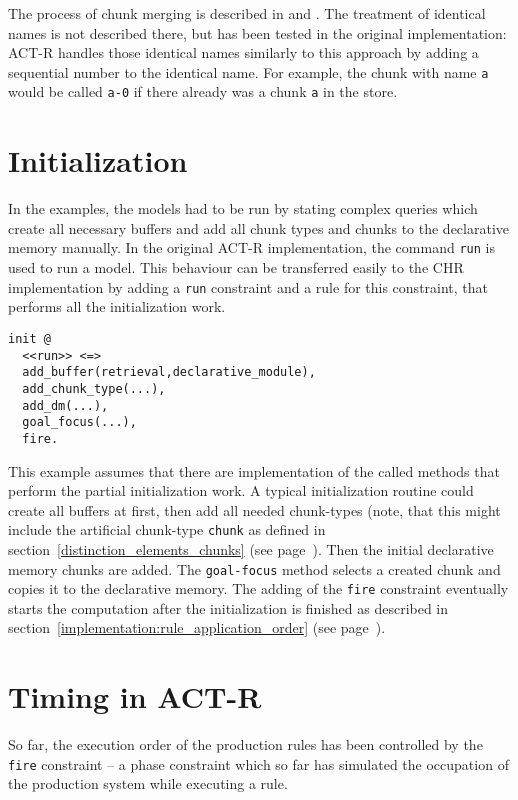The process of chunk merging is described in \cite[217, 71]{actr_reference} and \cite[3]{actr_tutorial}. The treatment of identical names is not described there, but has been tested in the original implementation: ACT-R handles those identical names similarly to this approach by adding a sequential number to the identical name. For example, the chunk with name \lstinline|a| would be called \lstinline|a-0| if there already was a chunk \lstinline|a| in the store.

\section{Initialization}
\label{initialization}

In the examples, the models had to be run by stating complex queries which create all necessary buffers and add all chunk types and chunks to the declarative memory manually. In the original ACT-R implementation, the command \lstinline|run| is used to run a model. This behaviour can be transferred easily to the CHR implementation by adding a \lstinline|run| constraint and a rule for this constraint, that performs all the initialization work.

\begin{lstlisting}
init @ 
  <<run>> <=> 
  add_buffer(retrieval,declarative_module),
  add_chunk_type(...),
  add_dm(...),
  goal_focus(...),
  fire.
\end{lstlisting}

This example assumes that there are implementation of the called methods that perform the partial initialization work. A typical initialization routine could create all buffers at first, then add all needed chunk-types (note, that this might include the artificial chunk-type \lstinline|chunk| as defined in section~\ref{distinction_elements_chunks} (see page~\pageref{distinction_elements_chunks}). Then the initial declarative memory chunks are added. The \lstinline|goal-focus| method selects a created chunk and copies it to the declarative memory. The adding of the \lstinline|fire| constraint eventually starts the computation after the initialization is finished as described in section~\ref{implementation:rule_application_order} (see page~\pageref{implementation:rule_application_order}).

\section{Timing in ACT-R}

So far, the execution order of the production rules has been controlled by the \lstinline|fire| constraint -- a phase constraint which so far has simulated the occupation of the production system while executing a rule.

